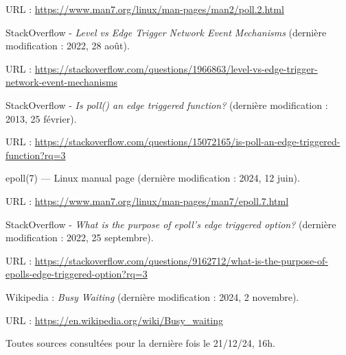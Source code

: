 \documentclass{article}
\begin{document}
\begin{thebibliography}{999}
    URL : \url{https://www.man7.org/linux/man-pages/man2/poll.2.html}


    StackOverflow - \textit{Level vs Edge Trigger Network Event Mechanisms} (dernière modification : 2022, 28 août).

    URL : \url{https://stackoverflow.com/questions/1966863/level-vs-edge-trigger-network-event-mechanisms}

    StackOverflow - \textit{Is poll() an edge triggered function?} (dernière modification : 2013, 25 février).

    URL : \url{https://stackoverflow.com/questions/15072165/is-poll-an-edge-triggered-function?rq=3}

    epoll(7) — Linux manual page (dernière modification : 2024, 12 juin).

    URL : \url{https://www.man7.org/linux/man-pages/man7/epoll.7.html}

    StackOverflow - \textit{What is the purpose of epoll's edge triggered option?} (dernière modification : 2022, 25 septembre).

    URL : \url{https://stackoverflow.com/questions/9162712/what-is-the-purpose-of-epolls-edge-triggered-option?rq=3}

    Wikipedia : \textit{Busy Waiting} (dernière modification : 2024, 2 novembre).

    URL : \url{https://en.wikipedia.org/wiki/Busy_waiting}
\end{thebibliography}
Toutes sources consultées pour la dernière fois le 21/12/24, 16h.
    
\end{document}
